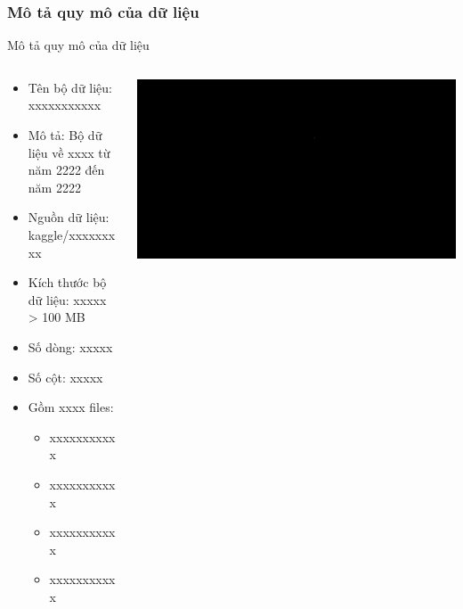 \documentclass{beamer}
\begin{document}
\subsubsection{Mô tả quy mô của dữ liệu}
\begin{frame}{Mô tả quy mô của dữ liệu}
\begin{columns}

\begin{column}{0.6\textwidth}
\begin{itemize}
\item Tên bộ dữ liệu: xxxxxxxxxxx
\item Mô tả: Bộ dữ liệu về xxxx từ năm 2222 đến năm 2222
\item Nguồn dữ liệu: kaggle/xxxxxxxxx
\item Kích thước bộ dữ liệu: xxxxx > 100 MB
\item Số dòng: xxxxx
\item Số cột: xxxxx
\item Gồm xxxx files:

\begin{itemize}
\item xxxxxxxxxxx
\item xxxxxxxxxxx
\item xxxxxxxxxxx
\item xxxxxxxxxxx

\end{itemize}

\end{itemize}
\end{column}

\begin{column}{0.9\textwidth}
\includegraphics[width=\textwidth]{pictures/black.png}
\end{column}

\end{columns}
\end{frame}
\end{document}
